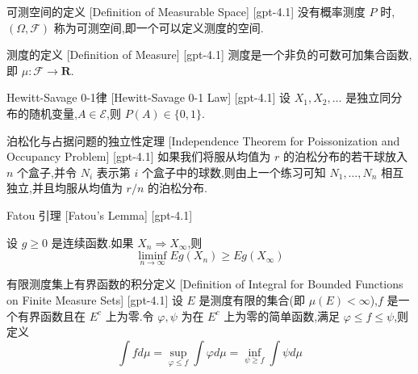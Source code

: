 \documentclass[UTF8]{ctexart}
\begin{document}
    
    
    \begin{dfn}
        {可测空间的定义}
        [Definition of Measurable Space]
        [gpt-4.1]
        没有概率测度 $P$ 时,$(\Omega, \mathcal{F})$ 称为可测空间,即一个可以定义测度的空间.
    \end{dfn}
    
    
    
    \begin{dfn}
        {测度的定义}
        [Definition of Measure]
        [gpt-4.1]
        测度是一个非负的可数可加集合函数,即 $\mu: \mathcal{F} \to \mathbf{R}$.
    \end{dfn}
    
    
    
    \begin{thm}
        {Hewitt-Savage 0-1律}
        [Hewitt-Savage 0-1 Law]
        [gpt-4.1]
        设 $X_{1}, X_{2}, \dots$ 是独立同分布的随机变量,$A \in \mathcal{E}$,则 $P(A) \in \{ 0, 1 \}$.
    \end{thm}
    
    
    
    \begin{thm}
        {泊松化与占据问题的独立性定理}
        [Independence Theorem for Poissonization and Occupancy Problem]
        [gpt-4.1]
        如果我们将服从均值为 $r$ 的泊松分布的若干球放入 $n$ 个盒子,并令 $N_{i}$ 表示第 $i$ 个盒子中的球数,则由上一个练习可知 $N_{1}, \ldots, N_{n}$ 相互独立,并且均服从均值为 $r/n$ 的泊松分布.
    \end{thm}
    
    
    
    \begin{lma}
        {Fatou 引理}
        [Fatou's Lemma]
        [gpt-4.1]
        
设 $g \ge 0$ 是连续函数.如果 $X_n \Rightarrow X_\infty$,则
\[
\liminf_{n \to \infty} E g(X_n) \geq E g(X_\infty)
\]

    \end{lma}
    
    
    
    \begin{dfn}
        {有限测度集上有界函数的积分定义}
        [Definition of Integral for Bounded Functions on Finite Measure Sets]
        [gpt-4.1]
        设 $E$ 是测度有限的集合(即 $\mu(E) < \infty$),$f$ 是一个有界函数且在 $E^c$ 上为零.令 $\varphi, \psi$ 为在 $E^c$ 上为零的简单函数,满足 $\varphi \leq f \leq \psi$,则定义
\[
\int f d\mu = \sup_{\varphi \leq f} \int \varphi d\mu = \inf_{\psi \geq f} \int \psi d\mu
\]

    \end{dfn}
    
\end{document}

